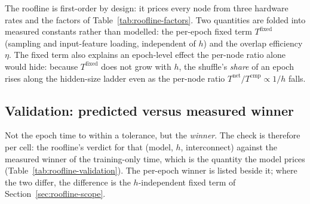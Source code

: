 The roofline is first-order by design: it prices every node from three hardware rates and the
factors of Table~\ref{tab:roofline-factors}. Two quantities are folded into measured
constants rather than modelled: the per-epoch fixed term $T^{\mathrm{fixed}}$ (sampling and
input-feature loading, independent of $h$) and the overlap efficiency $\eta$. The fixed term
also explains an epoch-level effect the per-node ratio alone would hide: because
$T^{\mathrm{fixed}}$ does not grow with $h$, the shuffle's \emph{share} of an epoch rises along
the hidden-size ladder even as the per-node ratio $T^{\mathrm{net}}/T^{\mathrm{cmp}}\propto 1/h$
falls. 

\subsection{Validation: predicted versus measured winner}
\label{sec:roofline-validation}

Not the epoch time to within a tolerance, but the \emph{winner}. The check is therefore
per cell: the roofline's verdict for that (model, $h$, interconnect) against the measured
winner of the training-only time, which is the quantity the model prices
(Table~\ref{tab:roofline-validation}). The per-epoch winner is listed beside it; where the
two differ, the difference is the $h$-independent fixed term of
Section~\ref{sec:roofline-scope}.



